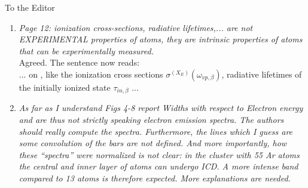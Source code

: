 \documentclass[DIN,pagenumber=false,parskip=half,fromalign=left,fromphone=true,fromemail=true,fromurl=false,fromlogo=false,fromrule=false]{scrlttr2}
\begin{document}
\begin{letter}{To the Editor}
\begin{enumerate}
{{For the ETMD(3) the approximation reads}}
%
\begin{align}                                                  
 \Gamma_{{\rm ETMD},j,\beta} =& \frac{c}{\pi} \sum\limits_{m,M_{in,D'}}      
                        \frac{\Theta_{m,k}(\alpha_j) \sigma^{(X_E)}(\omega_{vp,\beta})
                              \left| <\tilde{D}_{m,j,\beta}(M_{in,D'})>\right|^2}
                         {R_j^6 \omega_{vp,\beta}}\\           
               =& \frac{c}{\pi R_j^6}                          
               \sum\limits_{M_{in,D'}}                         
               \left( \left| <\tilde{D}_{x,j,\beta} (M_{in,D'}) > \right|^2  
                 (2+ \sin^2\alpha_j)                           
               + \left| <\tilde{D}_{z,j,\beta} (M_{in,D'}) > \right|^2       
                 (1+\cos^2\alpha_j) \right) \nonumber \\       
           & \times\, \frac{c\sigma^{(X_E)}(\omega_{vp,\beta})}{\omega_{vp,\beta}}
\end{align}                                                    
%                                                              
{}
$\Theta_{m}(\alpha_j)$ is a function depending on the angle $\alpha_j$       
of the triple and the direction of the dipole                  
transition moment $m$ ...

  \item \emph{Page 12:
        ionization cross-sections, radiative lifetimes,... are not EXPERIMENTAL properties of atoms, they are intrinsic properties of atoms that can be experimentally measured.}\\
        Agreed. The sentence now reads:\\
        ... on {\color{blue}{intrinsic atomic properties
        which can be determined experimentally}}, like the ionization
        cross sections
        $\sigma^{(X_E)}(\omega_{vp,\beta})$, radiative lifetimes of the initially
        ionized state $\tau_{in,\beta}$ ...
 
  \item \emph{As far as I understand Figs 4-8 report Widths with respect to Electron energy and are thus not strictly speaking electron emission spectra. The authors should really compute the spectra. Furthermore, the lines which I guess are some convolution of the bars are not defined. And more importantly, how these “spectra” were normalized is not clear: in the cluster with 55 Ar atoms the central and inner layer of atoms can undergo ICD. A more intense band compared to 13 atoms is therefore expected. More explanations are needed.}


\end{enumerate}
\end{letter}
\end{document}
